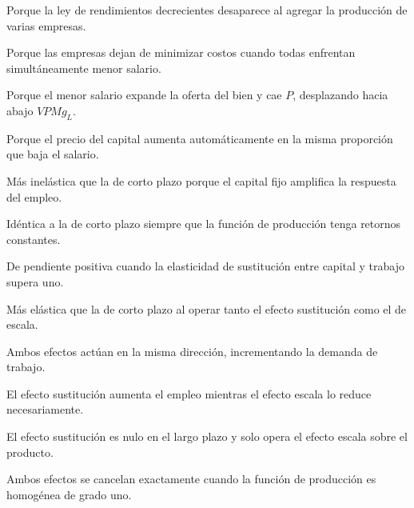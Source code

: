\begin{opts}
    \item Porque la ley de rendimientos decrecientes desaparece al agregar la producción de varias empresas.
    \item Porque las empresas dejan de minimizar costos cuando todas enfrentan simultáneamente menor salario.
    \item Porque el menor salario expande la oferta del bien y cae $P$, desplazando hacia abajo $VPMg_L$.
    \item Porque el precio del capital aumenta automáticamente en la misma proporción que baja el salario.
\end{opts}

\begin{opts}
    \item Más inelástica que la de corto plazo porque el capital fijo amplifica la respuesta del empleo.
    \item Idéntica a la de corto plazo siempre que la función de producción tenga retornos constantes.
    \item De pendiente positiva cuando la elasticidad de sustitución entre capital y trabajo supera uno.
    \item Más elástica que la de corto plazo al operar tanto el efecto sustitución como el de escala.
\end{opts}

\begin{opts}
    \item Ambos efectos actúan en la misma dirección, incrementando la demanda de trabajo.
    \item El efecto sustitución aumenta el empleo mientras el efecto escala lo reduce necesariamente.
    \item El efecto sustitución es nulo en el largo plazo y solo opera el efecto escala sobre el producto.
    \item Ambos efectos se cancelan exactamente cuando la función de producción es homogénea de grado uno.
\end{opts}

